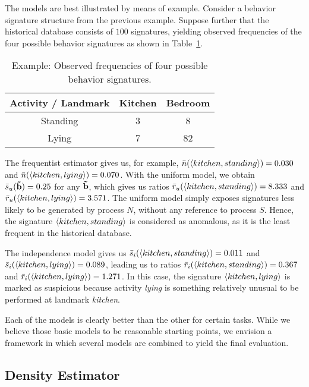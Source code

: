 The models are best illustrated by means of example. Consider a behavior signature structure from the previous example. Suppose further that the historical database consists of $100$ signatures, yielding observed frequencies of the four possible behavior signatures as shown in Table~\ref{tab:freq-example}.
\begin{table}[!ht]
\centering
\caption{Example: Observed frequencies of four possible behavior signatures.}
\renewcommand{\arraystretch}{1.2}
\begin{tabular}{ccc}
	\toprule
	Activity / Landmark		& Kitchen	& Bedroom	\\
	\hline
				Standing	& 3 		& 8			\\
				Lying		& 7 		& 82			\\
	\toprule
\end{tabular}
\label{tab:freq-example}
\end{table}

The frequentist estimator gives us, for example, $\bar{n}(\langle kitchen, standing \rangle)=0.030$ and $\bar{n}(\langle kitchen, lying \rangle)=0.070$. With the uniform model, we obtain $\bar{s}_u(\mathbf{\tilde{b}})=0.25$ for any $\mathbf{\tilde{b}}$, which gives us ratios $\bar{r}_u(\langle kitchen, standing \rangle)=8.333$ and $\bar{r}_u(\langle kitchen, lying \rangle)=3.571$. The uniform model simply exposes signatures less likely to be generated by process $N$, without any reference to process $S$. Hence, the signature $\langle kitchen, standing \rangle$ is considered as anomalous, as it is the least frequent in the historical database. 

The independence model gives us $\bar{s}_i(\langle kitchen, standing \rangle)=0.011$ and $\bar{s}_i(\langle kitchen, lying \rangle)=0.089$, leading us to ratios $\bar{r}_i(\langle kitchen, standing \rangle)=0.367$ and $\bar{r}_i(\langle kitchen, lying \rangle)=1.271$. In this case, the signature $\langle kitchen, lying \rangle$ is marked as suspicious because activity \emph{lying} is something relatively unusual to be performed at landmark \emph{kitchen}.


Each of the models is clearly better than the other for certain tasks. While we believe those basic models to be reasonable starting points, we envision a framework in which several models are combined to yield the final evaluation.

%
%
\subsection{Density Estimator}

